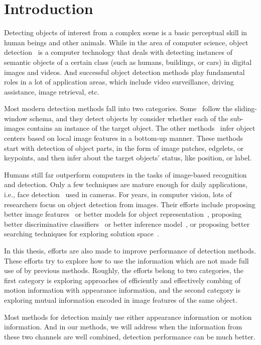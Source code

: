 \chapter{Introduction}
Detecting objects of interest from a complex scene is a basic perceptual skill in human beings and other animals.
While in the area of computer science, object detection~\cite{dod} is a computer technology that deals with detecting instances of semantic objects of a certain class (such as humans, buildings, or cars) in digital images and videos. And successful object detection
methods play fundamental roles in a lot of application areas, which include video surveillance, driving assistance, image retrieval, etc.

Most modern detection methods fall into two categories. Some~\cite{ij4,ac31,ac30,ac4,ac32,ac29,ac28,ac1} follow the sliding-window schema, and they detect objects by consider whether each of the sub-images contains an instance of the target object. The other methods~\cite{ac9,ac2,ac3,ac22,lb1,ac5,ac10,ac21,ac18} infer object centers based on local image features in a bottom-up manner. These methods start with detection of object parts, in the form of image patches, edgelets, or keypoints, and then infer about the target objects' status, like position, or label. 


 Humans still far outperform computers in the tasks of image-based recognition and detection. Only a few techniques are mature enough for daily applications, i.e., face detection~\cite{face} used in cameras. For years, in computer vision, lots of researchers focus on object detection from images. Their efforts include proposing better image features~\cite{o17} or better models for object representation~\cite{bgf}, proposing better discriminative classifiers~\cite{dlearn} or better inference model~\cite{hdp}, or proposing better searching techniques for exploring solution space~\cite{bab}.
 
 In this thesis, efforts are also made to improve performance of detection methods. These efforts try to explore how to use the information which are not made full use of by previous methods. Roughly, the efforts belong to two categories, the first category is exploring approaches of efficiently and effectively combing of motion information with appearance information, and the second category is exploring mutual information encoded in image features of the same object.
 
 Most methods for detection mainly use either appearance information or motion information. And in our methods, we will address when the information from these two channels are well combined, detection performance can be much better. 
 
